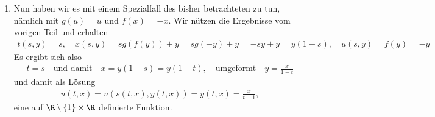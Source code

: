 \begin{solution}
\begin{enumerate}[label = (\roman*)]
	\item Nun haben wir es mit einem Spezialfall des bisher betrachteten zu tun, nämlich mit $g(u) = u$ und $f(x) = -x$. Wir nützen die Ergebnisse vom vorigen Teil und erhalten 
	\begin{align*}
	t(s,y) = s, \quad x(s,y) = sg(f(y)) + y = sg(-y) + y = -sy + y = y(1 - s), \quad u(s,y) = f(y) = -y
	\end{align*}
	Es ergibt sich also
	\begin{align*}
	t = s \quad \text{und damit} \quad x = y(1 - s) = y(1 - t), \quad \text{umgeformt} \quad y = \frac{x}{1 - t}
	\end{align*}
	und damit als Lösung
	\begin{align*}
	u(t,x) = u(s(t,x), y(t,x)) = y(t,x) = \frac{x}{t - 1}, 
	\end{align*}
	eine auf $\R \setminus \{1\} \times \R$ definierte Funktion.
\end{enumerate}

\end{solution}

